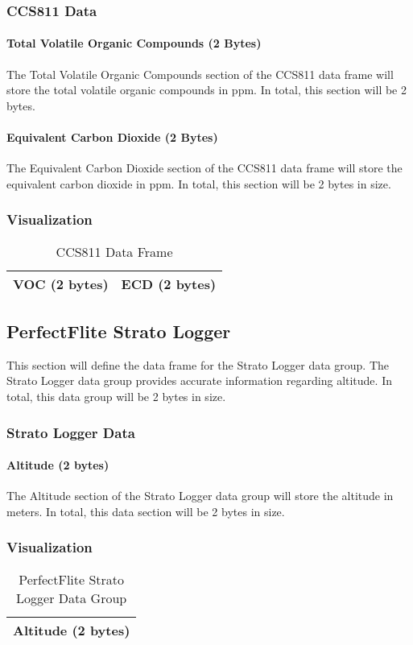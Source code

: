 \documentclass{article}
\begin{document}
  \subsubsection{CCS811 Data}
  \paragraph{Total Volatile Organic Compounds (2 Bytes)}
  The Total Volatile Organic Compounds section of the CCS811 data frame will store the total volatile organic compounds in ppm. In total, this section will be 2 bytes.
  \paragraph{Equivalent Carbon Dioxide (2 Bytes)}
  The Equivalent Carbon Dioxide section of the CCS811 data frame will store the equivalent carbon dioxide in ppm. In total, this section will be 2 bytes in size.
  \subsubsection{Visualization}
  
  \begin{table}[H]
  \centering
  \caption{CCS811 Data Frame}
  \label{my-label}
  \begin{tabular}{|l|l|}
  \hline
VOC (2 bytes) & ECD (2 bytes) \\ \hline 
  \end{tabular}
  \end{table}

  \subsection{PerfectFlite Strato Logger}
  This section will define the data frame for the Strato Logger data group. The Strato Logger data group provides accurate information regarding altitude. In total, this data group will be 2 bytes in size.
  \subsubsection{Strato Logger Data}
  \paragraph{Altitude (2 bytes)}
  The Altitude section of the Strato Logger data group will store the altitude in meters. In total, this data section will be 2 bytes in size.
  
  \subsubsection{Visualization}
  \begin{table}[H]
  \centering
  \caption{PerfectFlite Strato Logger Data Group}
  \label{my-label}
  \begin{tabular}{|l|}
  \hline
Altitude (2 bytes) \\ \hline
 \end{tabular}
 \end{table}
  
\end{document}
